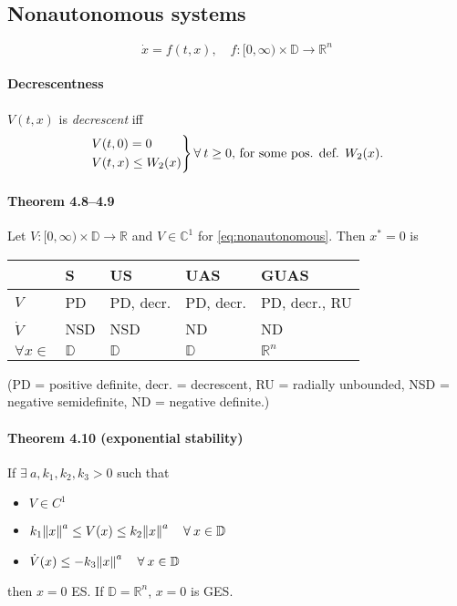 \subsection{Nonautonomous systems}
\begin{equation}\label{eq:nonautonomous}
	\dot{x} = f(t,x), \quad f : [0,\infty) \times \mathbb{D} \to \mathbb{R}^n
\end{equation}

\paragraph{Decrescentness}
$V(t,x)$ is \emph{decrescent} iff
\begin{equation}
	\begin{rcases}
		V(t,0) =    0      \\
		V(t,x) \leq W_2(x)
	\end{rcases}
	\forall \: t \geq 0
	\mbox{, for some pos. def. }
	W_2(x).
\end{equation}

\paragraph{Theorem 4.8--4.9}
Let $V : [0,\infty) \times \mathbb{D} \to \mathbb{R}$ and $V \in \mathbb{C}^1$ for \eqref{eq:nonautonomous}. Then $x^* = 0$ is
\begin{center}
	\begin{tabular}{lllll}
		& S & US & UAS & GUAS \\
		\hline
		$V$ & PD & PD, decr. & PD, decr. & PD, decr., RU \\
		$\dot{V}$ & NSD & NSD & ND & ND \\
		$\forall x \in$ & $\mathbb{D}$ & $\mathbb{D}$ & $\mathbb{D}$ & $\mathbb{R}^n$
	\end{tabular}
\end{center}
(PD = positive definite, decr. = decrescent, RU = radially unbounded, NSD = negative semidefinite, ND = negative definite.)

\paragraph{Theorem 4.10 (exponential stability)}
If $\exists \: a, k_1, k_2, k_3 > 0$ such that
\begin{itemize}
	\item $V \in C^1$
	\item $k_1 \norm{x}^a \leq V(x) \leq k_2 \norm{x}^a \quad \forall \: x \in \mathbb{D}$
	\item $\dot{V}(x) \leq - k_3 \norm{x}^a \quad \forall \: x \in \mathbb{D}$
\end{itemize}
then $x = 0$ ES. If $\mathbb{D} = \mathbb{R}^n$, $x = 0$ is GES.

